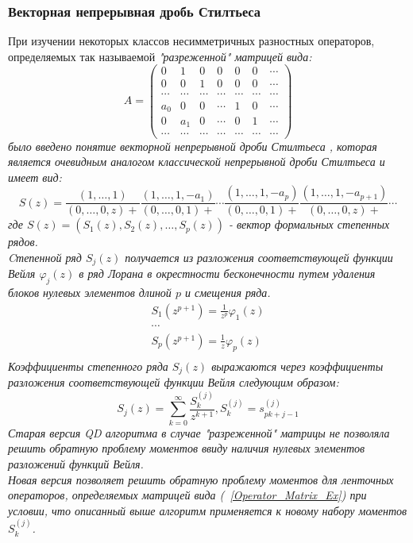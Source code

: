 \subsubsection{Векторная непрерывная дробь Стилтьеса}
При изучении некоторых классов несимметричных разностных
операторов, определяемых так называемой \it "разреженной" \rm
 матрицей вида:
\begin{equation}
\label{Operator_Matrix_Ex}
A= \left(\begin{array}{ccccccc}
0 & 1&0&0&0&0&\cdots\\
0 & 0 &1&0&0&0&\cdots\\
\cdots&\cdots&\cdots&\cdots&\cdots&\cdots&\cdots\\
a_0&0&0&\cdots&1&0&\cdots\\
0&a_1&0&\cdots&0&1&\cdots\\
\cdots&\cdots&\cdots&\cdots&\cdots&\cdots&\cdots
\end{array}\right)
\end{equation}
было введено понятие \it векторной непрерывной дроби Стилтьеса
\rm, которая является очевидным аналогом классической непрерывной
дроби Стилтьеса и имеет вид:
$$
S(z)=\frac{(1,\ldots,1)}{(0,\ldots,0,z)+}
\frac{(1,\ldots,1,-a_1)}{(0,\ldots,0,1)+}\cdots
\frac{(1,\ldots,1,-a_p)}{(0,\ldots,0,1)+}
\frac{(1,\ldots,1,-a_{p+1})}{(0,\ldots,0,z)+}\cdots
$$
где $S(z)=(S_1(z), S_2(z), \ldots, S_p(z))$ - вектор формальных
степенных рядов. \\
Cтепенной ряд $S_j(z)$ получается из разложения соответствующей
функции Вейля $\varphi_j(z)$ в ряд Лорана в окрестности
бесконечности путем удаления блоков нулевых элементов длиной $p$
и смещения ряда.
\begin{eqnarray}
S_1(z^{p+1}) = \frac{1}{z^p}\varphi_1(z) \nonumber \\
\cdots \nonumber \\
S_p(z^{p+1}) = \frac{1}{z}\varphi_p(z) \nonumber \\
\end{eqnarray}
Коэффициенты степенного ряда $S_j(z)$ выражаются через
коэффициенты разложения соответствующей функции Вейля следующим
образом:
$$
S_j(z)=\sum_{k=0}^{\infty}{\frac{S_k^{(j)}}{z^{k+1}}},
S_k^{(j)}=s_{pk+j-1}^{(j)}
$$
Старая версия QD алгоритма в случае "разреженной" матрицы не
позволяла решить обратную проблему моментов ввиду наличия нулевых
элементов разложений функций Вейля.\\
Новая версия позволяет решить обратную проблему моментов для
ленточных операторов, определяемых матрицей вида
(~\ref{Operator_Matrix_Ex}) при условии, что описанный выше алгоритм применяется к новому набору моментов $S_k^{(j)}$.\\
